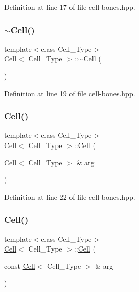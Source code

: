 Definition at line 17 of file cell-\/bones.\+hpp.

\mbox{\label{class_cell_a12667d768c7eab9e295b3476a5d60c0e}} 
\subsubsection{\texorpdfstring{$\sim$\+Cell()}{~Cell()}}
{\footnotesize\ttfamily template$<$class Cell\+\_\+\+Type$>$ \\
\hyperlink{class_cell}{Cell}$<$ Cell\+\_\+\+Type $>$\+::$\sim$\hyperlink{class_cell}{Cell} (\begin{DoxyParamCaption}{ }\end{DoxyParamCaption})\hspace{0.3cm}{\ttfamily [inline]}}



Definition at line 19 of file cell-\/bones.\+hpp.

\mbox{\label{class_cell_ac116d4235eadb134018324455a9bbdbf}} 
\subsubsection{\texorpdfstring{Cell()}{Cell()}\hspace{0.1cm}{\footnotesize\ttfamily [3/9]}}
{\footnotesize\ttfamily template$<$class Cell\+\_\+\+Type$>$ \\
\hyperlink{class_cell}{Cell}$<$ Cell\+\_\+\+Type $>$\+::\hyperlink{class_cell}{Cell} (\begin{DoxyParamCaption}\item[{\hyperlink{class_cell}{Cell}$<$ Cell\+\_\+\+Type $>$ \&}]{arg }\end{DoxyParamCaption})\hspace{0.3cm}{\ttfamily [inline]}}



Definition at line 22 of file cell-\/bones.\+hpp.

\mbox{\label{class_cell_ab745c6f11e7f43f06318b4bb733d9474}} 
\subsubsection{\texorpdfstring{Cell()}{Cell()}\hspace{0.1cm}{\footnotesize\ttfamily [4/9]}}
{\footnotesize\ttfamily template$<$class Cell\+\_\+\+Type$>$ \\
\hyperlink{class_cell}{Cell}$<$ Cell\+\_\+\+Type $>$\+::\hyperlink{class_cell}{Cell} (\begin{DoxyParamCaption}\item[{const \hyperlink{class_cell}{Cell}$<$ Cell\+\_\+\+Type $>$ \&}]{arg }\end{DoxyParamCaption})\hspace{0.3cm}{\ttfamily [inline]}}



